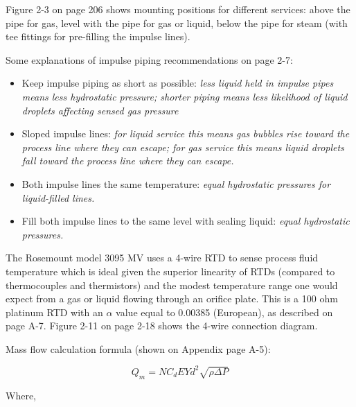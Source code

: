 












Figure 2-3 on page 206 shows mounting positions for different services: above the pipe for gas, level with the pipe for gas or liquid, below the pipe for steam (with tee fittings for pre-filling the impulse lines).

\vskip 10pt

Some explanations of impulse piping recommendations on page 2-7:

\begin{itemize}
\item{} Keep impulse piping as short as possible: {\it less liquid held in impulse pipes means less hydrostatic pressure; shorter piping means less likelihood of liquid droplets affecting sensed gas pressure}
\item{} Sloped impulse lines: {\it for liquid service this means gas bubbles rise toward the process line where they can escape; for gas service this means liquid droplets fall toward the process line where they can escape.}
\item{} Both impulse lines the same temperature: {\it equal hydrostatic pressures for liquid-filled lines.}
\item{} Fill both impulse lines to the same level with sealing liquid: {\it equal hydrostatic pressures.}
\end{itemize}

\vskip 10pt

The Rosemount model 3095 MV uses a 4-wire RTD to sense process fluid temperature which is ideal given the superior linearity of RTDs (compared to thermocouples and thermistors) and the modest temperature range one would expect from a gas or liquid flowing through an orifice plate.  This is a 100 ohm platinum RTD with an $\alpha$ value equal to 0.00385 (European), as described on page A-7.  Figure 2-11 on page 2-18 shows the 4-wire connection diagram.

\vskip 10pt

Mass flow calculation formula (shown on Appendix page A-5):

$$Q_m = N C_d E Y d^2 \sqrt{\rho \Delta P}$$

\noindent
Where,

